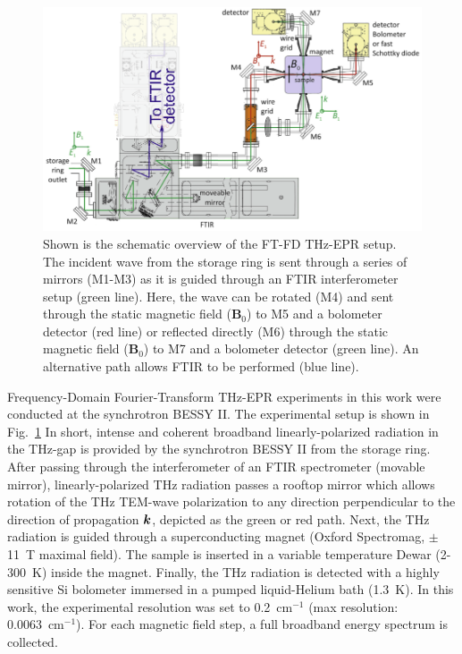 \begin{figure}[htpb]
\centering
  \includegraphics{Kapitel/Ch4-Images/Ch4-ExperimentSetup.eps}%
  \caption[Schematic Overview of FT-FD THz-EPR setup.]{Shown is the schematic overview of the FT-FD THz-EPR setup. The incident wave from the storage ring is sent through a series of mirrors (M1-M3) as it is guided through an FTIR interferometer setup (green line). Here, the wave can be rotated (M4) and sent through the static magnetic field (\textbf{B}$_0$) to M5 and a bolometer detector (red line) or reflected directly (M6) through the static magnetic field (\textbf{B}$_0$) to M7 and a bolometer detector (green line). An alternative path allows FTIR to be performed (blue line).}
  \label{ch4-fig:ExFDFTSetup}
\end{figure}

Frequency-Domain Fourier-Transform THz-EPR experiments in this work were conducted at the synchrotron BESSY II. The experimental setup is shown in Fig.~\ref{ch4-fig:ExFDFTSetup} \cite{Schnegg09,Nehrkorn13} In short, intense and coherent broadband linearly-polarized radiation in the THz-gap is provided by the synchrotron BESSY II from the storage ring. \cite{AboBakr02} After passing through the interferometer of an FTIR spectrometer (movable mirror), linearly-polarized THz radiation passes a rooftop mirror which allows rotation of the THz TEM-wave polarization to any direction perpendicular to the direction of propagation $\boldsymbol{k}$, depicted as the green or red path. Next, the THz radiation is guided through a superconducting magnet (Oxford Spectromag, $\pm$11~T maximal field). The sample is inserted in a variable temperature Dewar (2-300~K) inside the magnet. Finally, the THz radiation is detected with a highly sensitive Si bolometer immersed in a pumped liquid-Helium bath (1.3~K). In this work, the experimental resolution was set to 0.2~cm$^{-1}$ (max resolution: 0.0063~cm$^{-1}$). For each magnetic field step, a full broadband energy spectrum is collected. 

